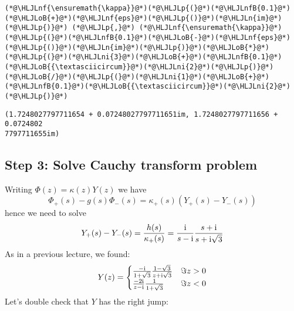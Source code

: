 \documentclass[12pt,landscape]{article}
\newcommand{\HLJLn}[1]{#1}
\newcommand{\HLJLnf}[1]{\textcolor[RGB]{66,102,213}{#1}}
\newcommand{\HLJLnfB}[1]{\textcolor[RGB]{59,151,46}{#1}}
\newcommand{\HLJLni}[1]{\textcolor[RGB]{59,151,46}{#1}}
\newcommand{\HLJLoB}[1]{\textcolor[RGB]{102,102,102}{\textbf{#1}}}
\newcommand{\HLJLp}[1]{#1}
\def\I{ {\rm i} }
\begin{document}
{\begin{lstlisting}
(*@\HLJLnf{\ensuremath{\kappa}}@*)(*@\HLJLp{(}@*)(*@\HLJLnfB{0.1}@*)(*@\HLJLoB{+}@*)(*@\HLJLnf{eps}@*)(*@\HLJLp{()}@*)(*@\HLJLn{im}@*)(*@\HLJLp{)}@*) (*@\HLJLp{,}@*) (*@\HLJLnf{\ensuremath{\kappa}}@*)(*@\HLJLp{(}@*)(*@\HLJLnfB{0.1}@*)(*@\HLJLoB{-}@*)(*@\HLJLnf{eps}@*)(*@\HLJLp{()}@*)(*@\HLJLn{im}@*)(*@\HLJLp{)}@*)(*@\HLJLoB{*}@*)(*@\HLJLp{(}@*)(*@\HLJLni{3}@*)(*@\HLJLoB{+}@*)(*@\HLJLnfB{0.1}@*)(*@\HLJLoB{{\textasciicircum}}@*)(*@\HLJLni{2}@*)(*@\HLJLp{)}@*)(*@\HLJLoB{/}@*)(*@\HLJLp{(}@*)(*@\HLJLni{1}@*)(*@\HLJLoB{+}@*)(*@\HLJLnfB{0.1}@*)(*@\HLJLoB{{\textasciicircum}}@*)(*@\HLJLni{2}@*)(*@\HLJLp{)}@*)
\end{lstlisting}

\begin{lstlisting}
(1.7248027797711654 + 0.07248027797711651im, 1.7248027797711656 + 0.0724802
7797711655im)
\end{lstlisting}


\subsection{Step 3: Solve Cauchy transform problem}
Writing $\Phi(z) = \kappa(z) Y(z)$ we have
\[
\Phi_+(s) - g(s) \Phi_-(s) = \kappa_+(s) (Y_+(s) - Y_-(s))
\]
hence we need to solve
\[
Y_+(s) - Y_-(s) = {h(s) \over \kappa_+(s)} = {\I \over s- \I} {s + \I \over s+ \I \sqrt{3}}
\]
As in a previous lecture, we found:
\[
Y(z) = \begin{cases}
{-\I \over 1+\sqrt 3} {1-\sqrt 3 \over z+ \I \sqrt{3}} & \Im z > 0 \\
{-2 \I \over z-\I}{1 \over 1+ \sqrt{3}} & \Im z < 0
\end{cases}
\]
Let's double check that $Y$ has the right jump:


}
\end{document}
